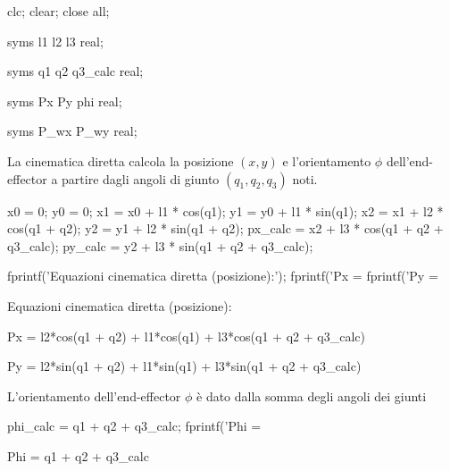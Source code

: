 \documentclass[11pt, a4paper]{article}
\begin{document}
\begin{matlabcode}
clc; clear; close all;

syms l1 l2 l3 real;

syms q1 q2 q3_calc real;

syms Px Py phi real;

syms P_wx P_wy real;
\end{matlabcode}

\begin{par}
\begin{flushleft}
La cinematica diretta calcola la posizione $(x,y)$ e l'orientamento $\phi$ dell'end-effector a partire dagli angoli di giunto $(q_1 ,q_2 ,q_3 )$ noti.
\end{flushleft}
\end{par}
\newpage
\begin{matlabcode}
x0 = 0;
y0 = 0;
x1 = x0 + l1 * cos(q1);
y1 = y0 + l1 * sin(q1);
x2 = x1 + l2 * cos(q1 + q2);
y2 = y1 + l2 * sin(q1 + q2);
px_calc = x2 + l3 * cos(q1 + q2 + q3_calc);
py_calc = y2 + l3 * sin(q1 + q2 + q3_calc);

fprintf('Equazioni cinematica diretta (posizione):\n');
fprintf('Px = %
fprintf('Py = %
\end{matlabcode}
\begin{matlaboutput}
Equazioni cinematica diretta (posizione):
\end{matlaboutput}
\begin{matlaboutput}
Px = l2*cos(q1 + q2) + l1*cos(q1) + l3*cos(q1 + q2 + q3_calc)
\end{matlaboutput}
\begin{matlaboutput}
Py = l2*sin(q1 + q2) + l1*sin(q1) + l3*sin(q1 + q2 + q3_calc)
\end{matlaboutput}

\begin{par}
\begin{flushleft}
 L'orientamento dell'end-effector $\phi$ è dato dalla somma degli angoli dei giunti
\end{flushleft}
\end{par}

\begin{matlabcode}
phi_calc = q1 + q2 + q3_calc;
fprintf('Phi = %
\end{matlabcode}
\begin{matlaboutput}
Phi = q1 + q2 + q3_calc
\end{matlaboutput}
\end{document}

